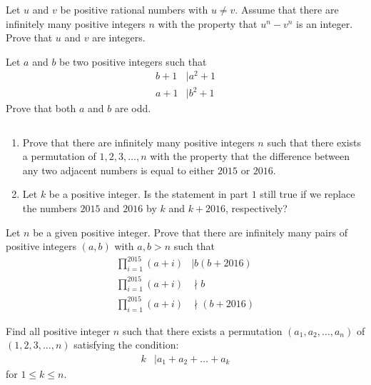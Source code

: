 \begin{problem}
	Let $u$ and $v$ be positive rational numbers with $u \neq v$. Assume that there are infinitely many positive integers $n$ with the property that $u^n - v^n$ is an integer. Prove that $u$ and $v$ are integers.
\end{problem}

\begin{problem}
	Let $a$ and $b$ be two positive integers such that
	\begin{align*}
		b + 1
			& \mid a^2 + 1\\
		a + 1
			& \mid b^2 + 1
	\end{align*}
	Prove that both $a$ and $b$ are odd.
\end{problem}

\begin{problem}
	$ $
	\begin{enumerate}
		\item Prove that there are infinitely many positive integers $n$ such that there exists a permutation of $1, 2,3, \dots, n$ with the property that the difference between any two adjacent numbers is equal to either $2015$ or $2016$.
		\item Let $k$ be a positive integer. Is the statement in part $1$ still true if we replace the numbers $2015$ and $2016$ by $k$ and $k + 2016$, respectively?
	\end{enumerate}
\end{problem}

\begin{problem}
	Let $n$ be a given positive integer. Prove that there are infinitely many pairs of positive integers $(a, b)$ with $a, b > n$ such that
	\begin{align*}
		\prod_{i=1}^{2015} (a+i) &\mid b(b+2016)\\
		\prod_{i=1}^{2015} (a+i) &\nmid b\\
		\prod_{i=1}^{2015} (a+i) &\nmid (b+2016)
	\end{align*}
\end{problem}

\begin{problem}
	Find all positive integer $n$ such that there exists a permutation $(a_1, a_2,\dots , a_n)$ of $(1, 2,3, \dots, n)$ satisfying the condition:
		\begin{align*}
			k
				& \mid a_1 + a_2 + \ldots+ a_k
		\end{align*}
	for $1\leq k\leq n$.
\end{problem}

